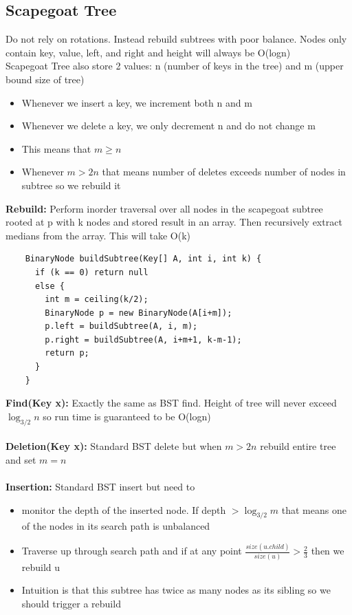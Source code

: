 \documentclass{article}
\begin{document}
  \subsection{Scapegoat Tree}
  Do not rely on rotations. Instead rebuild subtrees with poor balance. Nodes only contain key, value, left, and right and height will always be O(logn)\\
  Scapegoat Tree also store 2 values: n (number of keys in the tree) and m (upper bound size of tree)
  \begin{itemize}[noitemsep]
    \item Whenever we insert a key, we increment both n and m
    \item Whenever we delete a key, we only decrement n and do not change m
    \item This means that $m \geq n$
    \item Whenever $m > 2n$ that means number of deletes exceeds number of nodes in subtree so we rebuild it \\
  \end{itemize}
  \textbf{Rebuild: }Perform inorder traversal over all nodes in the scapegoat subtree rooted at p with k nodes and stored result in an array. Then recursively extract medians from the array. This will take O(k)
  \begin{lstlisting}
    BinaryNode buildSubtree(Key[] A, int i, int k) {
      if (k == 0) return null
      else {
        int m = ceiling(k/2);
        BinaryNode p = new BinaryNode(A[i+m]);
        p.left = buildSubtree(A, i, m);
        p.right = buildSubtree(A, i+m+1, k-m-1);
        return p;
      }
    }
  \end{lstlisting}
  \textbf{Find(Key x): }Exactly the same as BST find. Height of tree will never exceed $\log_{3/2}n$ so run time is guaranteed to be O(logn)\\ \\
  \textbf{Deletion(Key x): }Standard BST delete but when $m > 2n$ rebuild entire tree and set $m = n$\\ \\
  \textbf{Insertion: }Standard BST insert but need to 
  \begin{itemize}[noitemsep]
    \item monitor the depth of the inserted node. If depth $> \log_{3/2}m$ that means one of the nodes in its search path is unbalanced
    \item Traverse up through search path and if at any point $\frac{size(u.child)}{size(u)} > \frac{2}{3}$ then we rebuild u
    \item Intuition is that this subtree has twice as many nodes as its sibling so we should trigger a rebuild\\
  \end{itemize}
\end{document}
